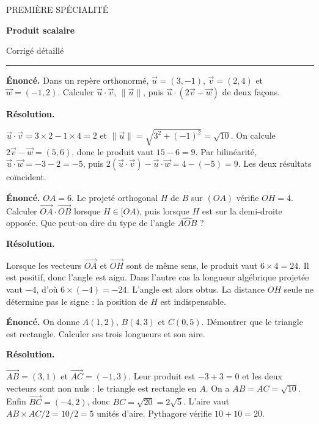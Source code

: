 \documentclass[11pt,a4paper]{article}
\begin{document}
{\small\color{Blue}PREMIÈRE SPÉCIALITÉ}\par{\LARGE\bfseries Produit scalaire}\par{\large Corrigé détaillé}\par\vspace{0.2cm}\hrule\vspace{0.4cm}
\par\noindent\begin{minipage}{\linewidth}
{\small\color{Muted}\textbf{Énoncé.} Dans un repère orthonormé, $\vec u=(3,-1)$, $\vec v=(2,4)$ et $\vec w=(-1,2)$. Calculer $\vec u\cdot\vec v$, $\|\vec u\|$, puis $\vec u\cdot(2\vec v-\vec w)$ de deux façons.}
\par\medskip
\textbf{Résolution.}\par
$\vec u\cdot\vec v=3\times2-1\times4=2$ et $\|\vec u\|=\sqrt{3^2+(-1)^2}=\sqrt{10}$. On calcule $2\vec v-\vec w=(5,6)$, donc le produit vaut $15-6=9$. Par bilinéarité, $\vec u\cdot\vec w=-3-2=-5$, puis $2(\vec u\cdot\vec v)-\vec u\cdot\vec w=4-(-5)=9$. Les deux résultats coïncident.
\end{minipage}\par
\par\noindent\begin{minipage}{\linewidth}
{\small\color{Muted}\textbf{Énoncé.} $OA=6$. Le projeté orthogonal $H$ de $B$ sur $(OA)$ vérifie $OH=4$. Calculer $\overrightarrow{OA}\cdot\overrightarrow{OB}$ lorsque $H\in[OA)$, puis lorsque $H$ est sur la demi-droite opposée. Que peut-on dire du type de l’angle $\widehat{AOB}$ ?}
\par\medskip
\textbf{Résolution.}\par
Lorsque les vecteurs $\overrightarrow{OA}$ et $\overrightarrow{OH}$ sont de même sens, le produit vaut $6\times4=24$. Il est positif, donc l’angle est aigu. Dans l’autre cas la longueur algébrique projetée vaut $-4$, d’où $6\times(-4)=-24$. L’angle est alors obtus. La distance $OH$ seule ne détermine pas le signe : la position de $H$ est indispensable.
\end{minipage}\par
\par\noindent\begin{minipage}{\linewidth}
{\small\color{Muted}\textbf{Énoncé.} On donne $A(1,2)$, $B(4,3)$ et $C(0,5)$. Démontrer que le triangle est rectangle. Calculer ses trois longueurs et son aire.}
\par\medskip
\textbf{Résolution.}\par
$\overrightarrow{AB}=(3,1)$ et $\overrightarrow{AC}=(-1,3)$. Leur produit est $-3+3=0$ et les deux vecteurs sont non nuls : le triangle est rectangle en $A$. On a $AB=AC=\sqrt{10}$. Enfin $\overrightarrow{BC}=(-4,2)$, donc $BC=\sqrt{20}=2\sqrt5$. L’aire vaut $AB\times AC/2=10/2=5$ unités d’aire. Pythagore vérifie $10+10=20$.
\end{minipage}\par
\end{document}
